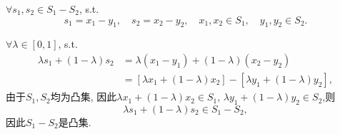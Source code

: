 \begin{enumerate}[label=\alph*)]
        $\forall s_1,s_2\in S_1-S_2$, s.t.
        \begin{equation*}
            s_1=x_1-y_1,\quad
            s_2=x_2-y_2,\quad
            x_1,x_2\in S_1,\quad
            y_1,y_2\in S_2.
        \end{equation*}

        $\forall\lambda\in[0,1]$, s.t.
        \begin{align*}
            \lambda s_1+(1-\lambda)s_2
            &=\lambda(x_1-y_1)+(1-\lambda)(x_2-y_2) \\
            &=[\lambda x_1+(1-\lambda)x_2]-[\lambda y_1+(1-\lambda)y_2],
        \end{align*}
        由于$S_1,S_2$均为凸集, 因此$\lambda x_1+(1-\lambda)x_2\in S_1$, $\lambda y_1+(1-\lambda)y_2\in S_2$,则
        \begin{equation*}
            \lambda s_1+(1-\lambda)s_2 \in S_1-S_2,
        \end{equation*}
        因此$S_1-S_2$是凸集.
\end{enumerate}
